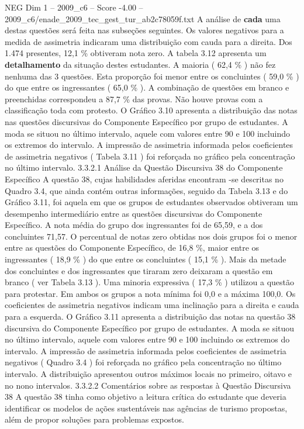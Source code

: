\begin{textsample}{NEG Dim 1 – 2009\_c6 – Score -4.00 – 2009\_c6/enade\_2009\_tec\_gest\_tur\_ab2c78059f.txt}
A análise de \textbf{cada} uma destas questões será feita nas subseções seguintes.
Os valores negativos para a medida de assimetria indicaram uma distribuição com cauda para a direita.
Dos 1.474 presentes, 12,1 \% obtiveram nota zero.
A tabela 3.12 apresenta um \textbf{detalhamento} da situação destes estudantes.
A maioria ( 62,4 \% ) não fez nenhuma das 3 questões.
Esta proporção foi menor entre os concluintes ( 59,0 \% ) do que entre os ingressantes ( 65,0 \% ).
A combinação de questões em branco e preenchidas correspondeu a 87,7 \% das provas.
Não houve provas com a classificação toda com protesto.
O Gráfico 3.10 apresenta a distribuição das notas nas questões discursivas do Componente Específico por grupo de estudantes.
A moda se situou no último intervalo, aquele com valores entre 90 e 100 incluindo os extremos do intervalo.
A impressão de assimetria informada pelos coeficientes de assimetria negativos ( Tabela 3.11 ) foi reforçada no gráfico pela concentração no último intervalo. 3.3.2.1 Análise da Questão Discursiva 38 do Componente Específico A questão 38, cujas habilidades aferidas encontram -se descritas no Quadro 3.4, que ainda contém outras informações, seguido da Tabela 3.13 e do Gráfico 3.11, foi aquela em que os grupos de estudantes observados obtiveram um desempenho intermediário entre as questões discursivas do Componente Específico.
A nota média do grupo dos ingressantes foi de 65,59, e a dos concluintes 71,57.
O percentual de notas zero obtidas nos dois grupos foi o menor entre as questões do Componente Específico, de 16,8 \%, maior entre os ingressantes ( 18,9 \% ) do que entre os concluintes ( 15,1 \% ).
Mais da metade dos concluintes e dos ingressantes que tiraram zero deixaram a questão em branco ( ver Tabela 3.13 ).
Uma minoria expressiva ( 17,3 \% ) utilizou a questão para protestar.
Em ambos os grupos a nota mínima foi 0,0 e a máxima 100,0.
Os coeficientes de assimetria negativos indicam uma inclinação para a direita e cauda para a esquerda.
O Gráfico 3.11 apresenta a distribuição das notas na questão 38 discursiva do Componente Específico por grupo de estudantes.
A moda se situou no último intervalo, aquele com valores entre 90 e 100 incluindo os extremos do intervalo.
A impressão de assimetria informada pelos coeficientes de assimetria negativos ( Quadro 3.4 ) foi reforçada no gráfico pela concentração no último intervalo.
A distribuição apresentou outros máximos locais no primeiro, oitavo e no nono intervalos. 3.3.2.2 Comentários sobre as respostas à Questão Discursiva 38 A questão 38 tinha como objetivo a leitura crítica do estudante que deveria identificar os modelos de ações sustentáveis nas agências de turismo propostas, além de propor soluções para problemas expostos.

\end{textsample}
